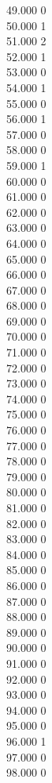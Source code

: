 { 49.000	0 \\
 50.000	1 \\
 51.000	2 \\
 52.000	1 \\
 53.000	0 \\
 54.000	1 \\
 55.000	0 \\
 56.000	1 \\
 57.000	0 \\
 58.000	0 \\
 59.000	1 \\
 60.000	0 \\
 61.000	0 \\
 62.000	0 \\
 63.000	0 \\
 64.000	0 \\
 65.000	0 \\
 66.000	0 \\
 67.000	0 \\
 68.000	0 \\
 69.000	0 \\
 70.000	0 \\
 71.000	0 \\
 72.000	0 \\
 73.000	0 \\
 74.000	0 \\
 75.000	0 \\
 76.000	0 \\
 77.000	0 \\
 78.000	0 \\
 79.000	0 \\
 80.000	0 \\
 81.000	0 \\
 82.000	0 \\
 83.000	0 \\
 84.000	0 \\
 85.000	0 \\
 86.000	0 \\
 87.000	0 \\
 88.000	0 \\
 89.000	0 \\
 90.000	0 \\
 91.000	0 \\
 92.000	0 \\
 93.000	0 \\
 94.000	0 \\
 95.000	0 \\
 96.000	1 \\
 97.000	0 \\
 98.000	0 \\
}
